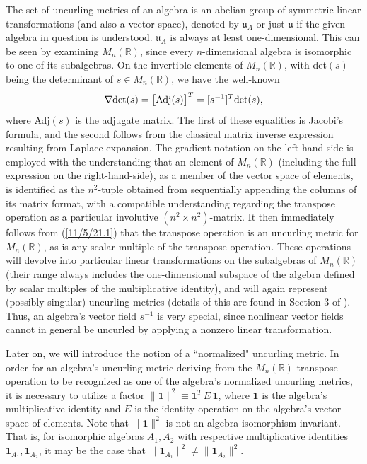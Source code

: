 \documentclass{amsart}
\numberwithin{equation}{section}
\theoremstyle{definition}
\numberwithin{theorem}{section}
\begin{document}
  The set of uncurling metrics of an algebra is an abelian group of symmetric linear transformations (and also a vector space), denoted by $\mathfrak{u}_A$ or just $\mathfrak{u}$ if the given algebra in question is understood.  $\mathfrak{u}_A$ is always at least one-dimensional.  This can be seen by examining $M_n(\mathbb{R})$, since every $n$-dimensional algebra is isomorphic to one of its subalgebras.  On the invertible elements of $M_n(\mathbb{R})$, with det$(s)$ being the determinant of $s\in M_n(\mathbb{R})$, we have the well-known
  \begin{equation}\label{11/5/21.1} \nabla \mbox{det}(s) = \big[{\rm Adj}(s)\big]^T = [s^{-1}]^T\mbox{det}(s),\end{equation} where Adj$(s)$ is the adjugate matrix.  The first of these equalities is Jacobi's formula, and the second follows from the classical matrix inverse expression resulting from Laplace expansion.  The gradient notation on the left-hand-side is employed with the understanding that an element of $M_n(\mathbb{R})$ (including the full expression on the right-hand-side), as a member of the vector space of elements, is identified as the $n^2$-tuple obtained from sequentially appending the columns of its matrix format, with a compatible understanding regarding the transpose operation as a particular involutive $(n^2\times n^2)$-matrix.  It then immediately follows from (\ref{11/5/21.1}) that the transpose operation is an uncurling metric for $M_n(\mathbb{R})$, as is any scalar multiple of the transpose operation.  These operations will devolve into particular linear transformations on the subalgebras of $M_n(\mathbb{R})$ (their range always includes the one-dimensional subspace of the algebra defined by scalar multiples of the multiplicative identity), and will again represent (possibly singular) uncurling metrics (details of this are found in Section 3 of \cite{fgreensite:2023}).
    Thus, an algebra's vector field $s^{-1}$ is very special, since nonlinear vector fields cannot in general be uncurled by applying a nonzero linear transformation.
    
    

Later on, we will introduce the notion of a ``normalized" uncurling metric.  In order for an algebra's uncurling metric deriving from the $M_n(\mathbb{R})$ transpose operation to be recognized as one of the algebra's normalized uncurling metrics, it is necessary to utilize a factor $\|\mathbf{1}\|^2 \equiv \mathbf{1}^T \,E\, \mathbf{1}$, where $\mathbf{1}$ is the algebra's multiplicative identity and $E$ is the identity operation on the algebra's vector space of elements.  Note that $\|\mathbf{1}\|^2$ is not an algebra isomorphism invariant.  That is, for isomorphic algebras $A_1,A_2$ with respective multiplicative identities $\mathbf{1}_{A_1}, \mathbf{1}_{A_2}$, it may be the case that $\|\mathbf{1}_{A_1}\|^2 \ne \|\mathbf{1}_{A_2}\|^2$.
\end{document}
